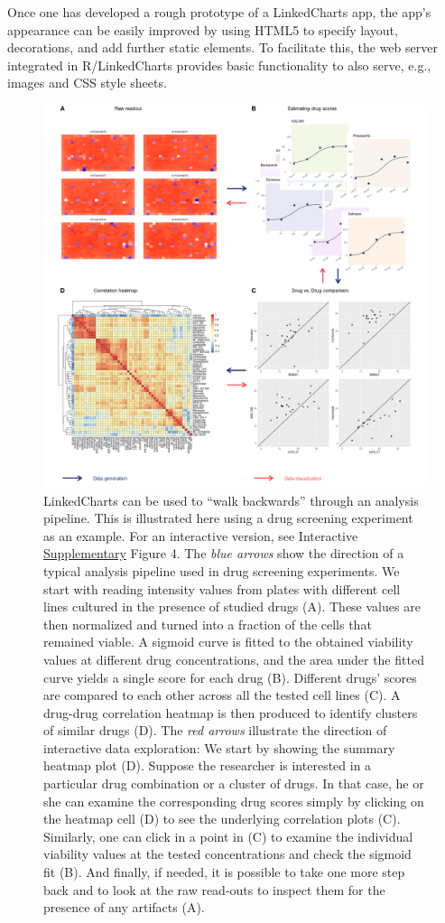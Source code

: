 \documentclass[twocolumn,10pt]{article}
\newcommand{\Supplementary}{\href{https://anders-biostat.github.io/lc-paper/}{Supplementary}}
\begin{document}
Once one has developed a rough prototype of a LinkedCharts app, the app's appearance can be easily improved by using HTML5 to specify layout, decorations, and add further static elements. To facilitate this, the web server integrated in R/LinkedCharts provides basic functionality to also serve, e.g., images and CSS style sheets.

\begin{figure}
	\includegraphics[width=\textwidth]{FigC/figC.png}
	\caption{LinkedCharts can be used to ``walk backwards'' through an analysis pipeline. This is illustrated here using a drug screening experiment \citep{he_2018} as an example.
		For an interactive version, see Interactive \Supplementary{} Figure 4.
		The \emph{blue arrows} show the direction of a typical analysis pipeline used in drug screening experiments. We start with reading intensity values from plates with different cell lines cultured in the presence of studied drugs (A). These values are then normalized and turned into a fraction of the cells that remained viable. A sigmoid curve is fitted to the obtained viability values at different drug concentrations, and the area under the fitted curve yields a single score for each drug (B). Different drugs' scores are compared to each other across all the tested cell lines (C). A drug-drug correlation heatmap is then produced to identify clusters of similar drugs (D). The \emph{red arrows} illustrate the direction of interactive data exploration: We start by showing the summary heatmap plot (D). Suppose the researcher is interested in a particular drug combination or a cluster of drugs. In that case, he or she can examine the corresponding drug scores simply by clicking on the heatmap cell (D) to see the underlying correlation plots (C). Similarly, one can click in a point in (C) to examine the individual viability values at the tested concentrations and check the sigmoid fit (B). And finally, if needed, it is possible to take one more step back and to look at the raw read-outs to inspect them for the presence of any artifacts (A).}

\end{figure}
\end{document}
